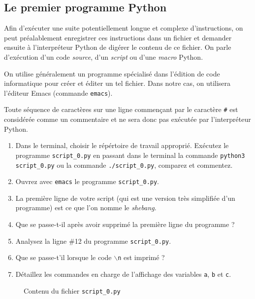 \subsection{Le premier programme Python}

Afin  d'exécuter   une  suite   potentiellement  longue   et  complexe
d'instructions, on peut
préalablement enregistrer ces instructions dans un fichier et demander
ensuite à l'interpréteur Python de  \og{}digérer\fg{} le contenu de ce
fichier.   On  parle   d'exécution  d'un   code  \emph{source},   d'un
\emph{script} ou d'une \emph{macro} Python.

On utilise généralement un programme spécialisé dans l'édition
de code informatique pour créer et éditer un tel fichier. Dans notre cas,
on utilisera l'éditeur Emacs (commande \texttt{emacs}).

Toute séquence de caractères sur une ligne
commençant par le caractère \verb+#+  est considérée comme un commentaire
et ne sera donc pas exécutée par l'interpréteur Python.

\begin{enumerate}
\item Dans le terminal, choisir le répértoire de travail approprié.
  Exécutez  le programme \texttt{script\_0.py} en  passant dans le
  terminal  la commande  \texttt{python3 script\_0.py}  ou la  commande
  \texttt{./script\_0.py}, comparez et commentez.

\item Ouvrez avec \texttt{emacs} le programme \texttt{script\_0.py}.

\item La première ligne de  votre script (qui est une version
  très simplifiée d'un programme) est ce que l'on nomme le \emph{shebang}.

\item Que  se passe-t-il après  avoir supprimé  la première  ligne du
  programme ?

\item Analysez la ligne \#12 du programme \texttt{script\_0.py}.

\item Que se passe-t'il lorsque le code \texttt{$\backslash$n} est imprimé ?

\item Détaillez les commandes en  charge de l'affichage des variables
  \texttt{a}, \texttt{b} et \texttt{c}.


\end{enumerate}
\begin{figure}  
  
  \caption{Contenu du fichier \texttt{script\_0.py}}
  \label{polynome_script_0}
\end{figure}





